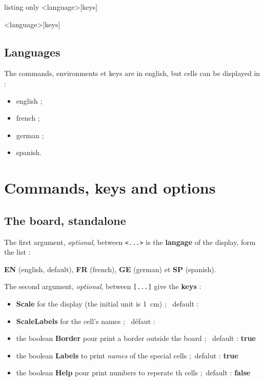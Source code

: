 \documentclass{article}
\newcommand\Cle[1]{{\bfseries\sffamily\textlangle #1\textrangle}}
\begin{document}
\begin{PresentationCode}{listing only}
\ScrabbleBoard<language>[keys]

\begin{EnvScrabble}<language>[keys]
\end{EnvScrabble}
\end{PresentationCode}

\subsection{Languages}

The \textsf{commands}, \textsf{environments} et \textsf{keys} are in english, but cells can be displayed in :

\begin{itemize}
	\item english ;
	\item french ;
	\item german ;
	\item spanish.
\end{itemize}

\pagebreak

\section{Commands, keys and options}

\subsection{The board, standalone}

The first argument, \textit{optional}, between \texttt{<...>} is the \Cle{langage} of the display, form the list :

\hfill\Cle{EN} (english, default), \Cle{FR} (french), \Cle{GE} (german) et \Cle{SP} (spanish).\hfill~

\smallskip

The second argument, \textit{optional}, between \texttt{[...]} give the \Cle{keys} :

\begin{itemize}
	\item \Cle{Scale} for the display (the initial unit is 1~cm) ; \hfill~default : \Cle{1}
	\item \Cle{ScaleLabels} for the cell's names ; \hfill~défaut : \Cle{1}
	\item the boolean \Cle{Border} pour print a border outside the board ; \hfill~default : \Cle{true}
	\item the boolean \Cle{Labels} to print \textit{names} of the special cells ;\hfill~defalut : \Cle{true}
	\item the boolean \Cle{Help} pour print numbers to reperate th cells ;\hfill~default : \Cle{false}
\end{itemize}
\end{document}
